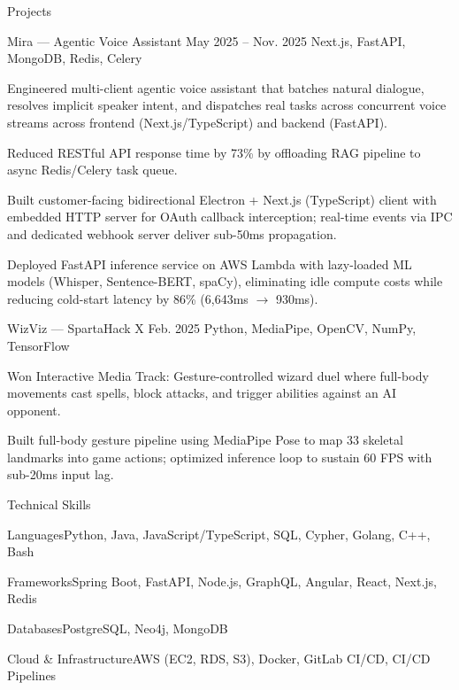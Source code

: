 \documentclass[
	11pt
]{../../../resume}
\begin{document}
	\begin{rSection}{P}{rojects}
		\begin{rSectionEntry}
			{Mira --- Agentic Voice Assistant}
			{May 2025 -- Nov. 2025}
			{}
			{Next.js, FastAPI, MongoDB, Redis, Celery}
			{}

			\item Engineered multi-client agentic voice assistant that batches natural dialogue, resolves implicit speaker intent, and dispatches real tasks across concurrent voice streams across frontend (Next.js/TypeScript) and backend (FastAPI).
			\item Reduced RESTful API response time by 73\% by offloading RAG pipeline to async Redis/Celery task queue.
			\item Built customer-facing bidirectional Electron + Next.js (TypeScript) client with embedded HTTP server for OAuth callback interception; real-time events via IPC and dedicated webhook server deliver sub-50ms propagation.
			\item Deployed FastAPI inference service on AWS Lambda with lazy-loaded ML models (Whisper, Sentence-BERT, spaCy), eliminating idle compute costs while reducing cold-start latency by 86\% (6{,}643ms $\rightarrow$ 930ms).
		\end{rSectionEntry}

		\begin{rSectionEntry}
			{WizViz --- SpartaHack X}
			{Feb. 2025}
			{}
			{Python, MediaPipe, OpenCV, NumPy, TensorFlow}
			{}

			\item Won Interactive Media Track: Gesture-controlled wizard duel where full-body movements cast spells, block attacks, and trigger abilities against an AI opponent.
			\item Built full-body gesture pipeline using MediaPipe Pose to map 33 skeletal landmarks into game actions; optimized inference loop to sustain 60 FPS with sub-20ms input lag.
		\end{rSectionEntry}
	\end{rSection}

	\begin{rSection}{T}{echnical Skills}
		\begin{rSet}{Languages}{Python, Java, JavaScript/TypeScript, SQL, Cypher, Golang, C++, Bash}
		\end{rSet}
		\begin{rSet}{Frameworks}{Spring Boot, FastAPI, Node.js, GraphQL, Angular, React, Next.js, Redis}
		\end{rSet}
		\begin{rSet}{Databases}{PostgreSQL, Neo4j, MongoDB}
		\end{rSet}
		\begin{rSet}{Cloud \& Infrastructure}{AWS (EC2, RDS, S3), Docker, GitLab CI/CD, CI/CD Pipelines}
		\end{rSet}
	\end{rSection}
\end{document}
